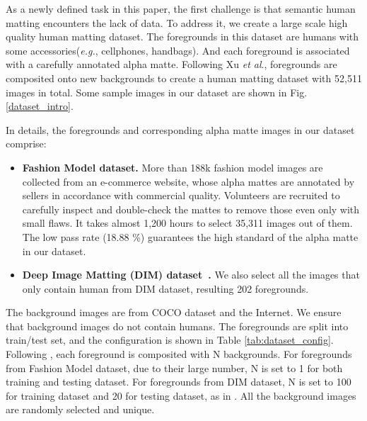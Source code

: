 As a newly defined task in this paper, the first challenge is that semantic human matting encounters the lack of data.
To address it, we create a large scale high quality human matting dataset.
The foregrounds in this dataset are humans with some accessories(\emph{e.g.}, cellphones, handbags).
And each foreground is associated with a carefully annotated alpha matte.
Following Xu \emph{et al}.\cite{xu2017deep}, foregrounds are composited onto new backgrounds to create a human matting dataset with 52,511 images in total.
Some sample images in our dataset are shown in Fig. \ref{dataset_intro}.

In details, the foregrounds and corresponding alpha matte images in our dataset comprise:
\begin{itemize}

\item \textbf{Fashion Model dataset.}
 More than 188k fashion model images are collected from an e-commerce website, whose alpha mattes are annotated by sellers in accordance with
 commercial quality. Volunteers are recruited to carefully inspect and double-check the mattes to remove those even only with small flaws. It takes almost 1,200 hours to select 35,311 images out of them. The low pass rate (18.88 \%) guarantees the high standard of the alpha matte in our dataset.


\item \textbf{Deep Image Matting (DIM) dataset~\cite{xu2017deep}.} We also select all the images that only contain human from DIM dataset, resulting 202 foregrounds.
\end{itemize}
The background images are  from COCO dataset and the Internet.
We ensure that background images do not contain humans.
The foregrounds are split into train/test set, and the configuration is shown in Table \ref{tab:dataset_config}.
Following \cite{xu2017deep}, each foreground is composited with N backgrounds.
For foregrounds from Fashion Model dataset, due to their large number, N is set to 1 for both training and testing dataset.
For foregrounds from DIM dataset, N is set to 100 for training dataset and 20 for testing dataset, as in \cite{xu2017deep}.
All the background images are randomly selected and unique.

